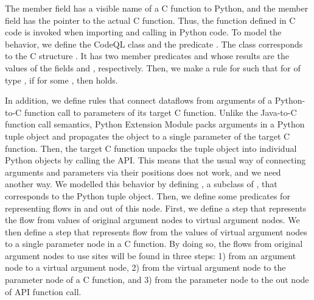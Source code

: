 \noindent
The member field  has a visible name of a C function to Python,
and the member field  has the pointer to the actual C function.
Thus, the function  defined in C code is invoked when
importing and calling  in Python code.
To model the behavior, we define the CodeQL class 
and the predicate . The class 
corresponds to the C structure . It has
two member predicates  and  whose results are
the values of the fields  and , respectively.
Then, we make a rule for  such that for  of type ,
if  
for some , then   holds.



In addition, we define rules that connect dataflows from arguments of
a Python-to-C function call to parameters of its target C function.
Unlike the Java-to-C function call semantics, Python Extension Module
packs arguments in a Python tuple object and propagates the object to a single
parameter of the target C function. 
Then, the target C function unpacks the tuple object into individual Python
objects by calling the  API. 
This means that the usual way of connecting arguments and parameters via their
positions does not work, and we need another way.
We modelled this behavior by defining , a subclass of ,
that corresponds to the Python tuple object. Then, we define some predicates
for representing flows in and out of this node. First, we define a
step that represents the flow from values of original argument nodes to virtual argument nodes. We then define
a step that represents flow from the values of virtual argument nodes to a single parameter node in a C function.
By doing so, the flows from original argument nodes to use sites will be
found in three steps: 1) from an argument node to a virtual argument node,
2) from the virtual argument node to the parameter node of a C function,
and 3) from the parameter node to the out node of  API function call.


